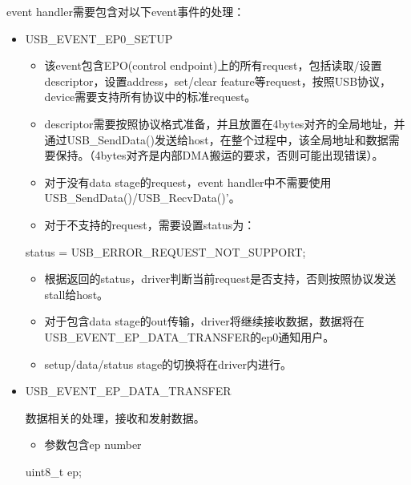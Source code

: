 \documentclass[
  12pt,
]{book}
\newenvironment{Shaded}{\begin{snugshade}}{\end{snugshade}}
\newcommand{\DataTypeTok}[1]{\textcolor[rgb]{0.13,0.29,0.53}{#1}}
\newcommand{\NormalTok}[1]{#1}
\providecommand{\tightlist}{%
  \setlength{\itemsep}{0pt}\setlength{\parskip}{0pt}}
\begin{document}
event handler需要包含对以下event事件的处理：

\begin{itemize}
\item
  USB\_EVENT\_EP0\_SETUP

  \begin{itemize}
  \tightlist
  \item
    该event包含EPO(control endpoint)上的所有request，包括读取/设置 descriptor，设置address，set/clear feature等request，按照USB协议，device需要支持所有协议中的标准request。
  \item
    descriptor需要按照协议格式准备，并且放置在4bytes对齐的全局地址，并通过USB\_SendData()发送给host，在整个过程中，该全局地址和数据需要保持。（4bytes对齐是内部DMA搬运的要求，否则可能出现错误）。
  \item
    对于没有data stage的request，event handler中不需要使用USB\_SendData()/USB\_RecvData()'。
  \item
    对于不支持的request，需要设置status为：
  \end{itemize}

\begin{Shaded}
\begin{Highlighting}[]
\NormalTok{status = USB_ERROR_REQUEST_NOT_SUPPORT;}
\end{Highlighting}
\end{Shaded}

  \begin{itemize}
  \tightlist
  \item
    根据返回的status，driver判断当前request是否支持，否则按照协议发送stall给host。
  \item
    对于包含data stage的out传输，driver将继续接收数据，数据将在USB\_EVENT\_EP\_DATA\_TRANSFER的ep0通知用户。
  \item
    setup/data/status stage的切换将在driver内进行。
  \end{itemize}
\item
  USB\_EVENT\_EP\_DATA\_TRANSFER

  数据相关的处理，接收和发射数据。

  \begin{itemize}
  \tightlist
  \item
    参数包含ep number
  \end{itemize}

\begin{Shaded}
\begin{Highlighting}[]
\DataTypeTok{uint8_t}\NormalTok{  ep;}
\end{Highlighting}
\end{Shaded}


\end{itemize}
\end{document}
